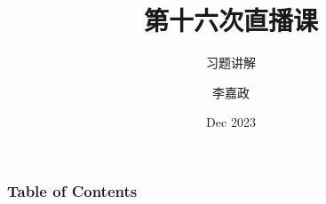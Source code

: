 \documentclass[10pt,hyperref={CJKbookmarks=true}]{beamer}
\title[第十六次直播课] %
{第十六次直播课}
\subtitle{习题讲解}
\author[李嘉政] %
{李嘉政}
\date[VLC 2021] %
{Dec 2023}
\begin{document}
\frame{\titlepage}


\begin{frame}
\frametitle{Table of Contents}
\tableofcontents
\end{frame}







%
%
%
%
%
% 
% 
% 










\end{document}
